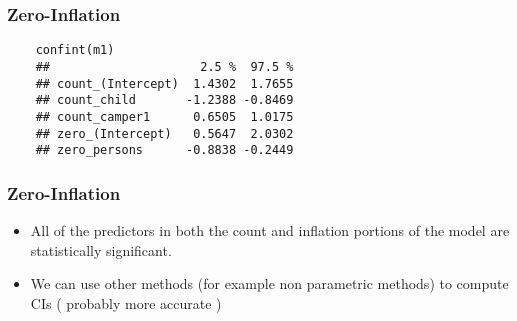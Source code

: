 \documentclass[MASTER.tex]{subfiles}
\begin{document}

\begin{frame}[fragile]
\frametitle{Zero-Inflation}
	\large
	\begin{verbatim}
	confint(m1)
	##                     2.5 %  97.5 %
	## count_(Intercept)  1.4302  1.7655
	## count_child       -1.2388 -0.8469
	## count_camper1      0.6505  1.0175
	## zero_(Intercept)   0.5647  2.0302
	## zero_persons      -0.8838 -0.2449
	\end{verbatim}
\end{frame}
\begin{frame}[fragile]
\frametitle{Zero-Inflation}
\Large
	\begin{itemize}
		\item	All of the predictors in both the count and inflation portions of the model are statistically significant. 
		\item We can use other methods  (for example non parametric methods) to compute CIs ( probably more accurate )
	\end{itemize}
\end{frame}
\end{document}
